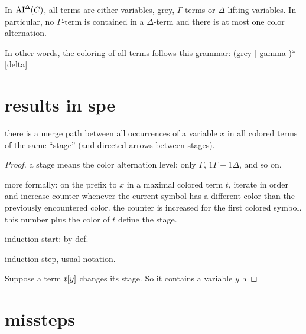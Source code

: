 \documentclass[,%
	paper=a4,%
	DIV9, %
	twoside=false,%
	liststotoc,
	bibtotoc,
	draft=false,%
	numbers=noendperiod
]{scrartcl}
\begin{document}
\begin{prop}
	\label{prop:no_delta_term_in_ai_delta}
	In $\operatorname{AI}^\Delta(C)$, all terms are either variables, grey, $\Gamma$-terms or $\Delta$-lifting variables. 
	In particular, no $\Gamma$-term is contained in a $\Delta$-term and there is at most one color alternation. 

	In other words, the coloring of all terms follows this grammar:
	(grey | gamma )* [delta]

\end{prop}
\section{results in spe}

\begin{clemma}
	there is a merge path between all occurrences of a variable $x$ in all colored terms of the same ``stage'' (and directed arrows between stages).
\end{clemma}
\begin{proof}
	a stage means the color alternation level: only $\Gamma$, $1 \Gamma + 1 \Delta$, and so on.

	more formally: on the prefix to $x$ in a maximal colored term $t$, iterate in order and increase counter whenever the current symbol has a different color than the previously encountered color. the counter is increased for the first colored symbol. this number plus the color of $t$ define the stage.

	induction start: by def.

	induction step, usual notation.

	Suppose a term $t[y]$ changes its stage. 
	So it contains a variable $y$ h





\end{proof}



\section{missteps}
\end{document}
